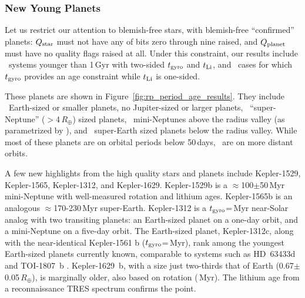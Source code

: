 \documentclass[11pt,twocolumn,tighten]{aastex63}
\begin{document}
\subsubsection{New Young Planets}

Let us restrict our attention to blemish-free stars, with blemish-free
``confirmed'' planets: $Q_{\rm star}$ must not have any of bits zero
through nine raised, and $Q_{\rm planet}$ must have no quality flags
raised at all.  Under this constraint, our results include
\ltonegyrhighqconfirmedtwosided\ systems younger than 1\,Gyr with
two-sided $t_{\rm gyro}$ and $t_{\rm Li}$, and
\ltonegyrhighqconfirmedonesided\ cases for which $t_{\rm gyro}$
provides an age constraint while $t_{\rm Li}$ is one-sided.

These planets are shown in Figure~\ref{fig:rp_period_age_results}.
They include \nearthshighqconfirmed\ Earth-sized or smaller planets,
no Jupiter-sized or larger planets, \nsubsaturnshighqconfirmed\
``super-Neptune'' ($>$4\,$R_\oplus$) sized planets,
\nminineptuneshighqconfirmed\ mini-Neptunes above the radius valley
(as parametrized by \citealt{2018MNRAS.479.4786V}), and
\nsuperearthshighqconfirmed\ super-Earth sized planets below the
radius valley.  While most of these planets are on orbital periods
below 50\,days, \nlongperiodhighqconfirmed\ are on more distant
orbits.

A few new highlights from the high quality stars and planets include
Kepler-1529, Kepler-1565, Kepler-1312, and Kepler-1629.  Kepler-1529b
is a $\approx$100$\pm$50\,Myr mini-Neptune with well-measured rotation
and lithium ages.  Kepler-1565b is an analogous $\approx$170-230\,Myr
super-Earth.  Kepler-1312 is a $t_{\rm gyro}$=\kepthirteentwelve\,Myr
near-Solar analog with two transiting planets: an Earth-sized planet
on a one-day orbit, and a mini-Neptune on a five-day orbit.  The
Earth-sized planet, Kepler-1312c, along with the near-identical
Kepler-1561 b ($t_{\rm gyro}$=\kepfifteensixone\,Myr), rank among the
youngest Earth-sized planets currently known, comparable to systems
such as HD~63433d \citep[1.1\,$R_\oplus$,
$414$$\pm$$23$\,Myr;][]{2024AJ....167...54C} and TOI-1807~b
\citep[1.3\,$R_\oplus$, 180$\pm$40\,Myr;][]{2021AJ....162...54H}.
Kepler-1629~b, with a size just two-thirds that of Earth
(0.67$\pm$0.05\,$R_\oplus$), is marginally older, also based on
rotation (\kepsixteentwonine\,Myr).  The lithium age from a
reconnaissance TRES spectrum confirms the point.
\end{document}
